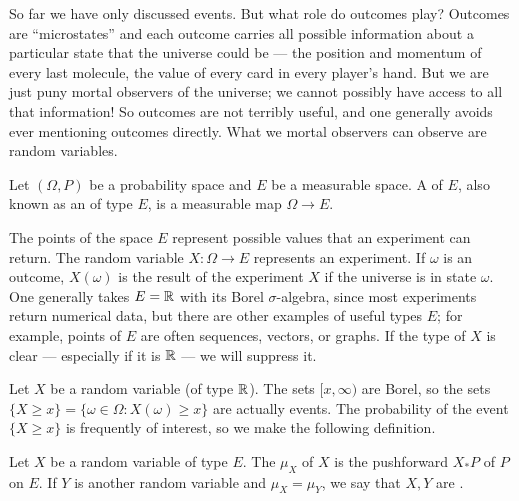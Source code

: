 \begin{subsec}
So far we have only discussed events. But what role do outcomes play?
Outcomes are ``microstates'' and each outcome carries all possible information about a particular state that the universe could be --- the position and momentum of every last molecule, the value of every card in every player's hand.
But we are just puny mortal observers of the universe; we cannot possibly have access to all that information!
So outcomes are not terribly useful, and one generally avoids ever mentioning outcomes directly.
What we mortal observers can observe are random variables.
\end{subsec}

\begin{definition}
Let $(\Omega, P)$ be a probability space and $E$ be a measurable space.
A  of  $E$, also known as an  of type $E$, is a measurable map $\Omega \to E$.
\end{definition}

\begin{subsec}
The points of the space $E$ represent possible values that an experiment can return.
The random variable $X: \Omega \to E$ represents an experiment. If $\omega$ is an outcome, $X(\omega)$ is the result of the experiment $X$ if the universe is in state $\omega$.
One generally takes $E = \mathbb{R}$ with its Borel $\sigma$-algebra, since most experiments return numerical data, but there are other examples of useful types $E$; for example, points of $E$ are often sequences, vectors, or graphs.
If the type of $X$ is clear --- especially if it is $\mathbb{R}$ --- we will suppress it.
\end{subsec}

\begin{subsec}
Let $X$ be a random variable (of type $\mathbb{R}$).
The sets $[x, \infty)$ are Borel, so the sets $\{X \geq x\} = \{\omega \in \Omega: X(\omega) \geq x\}$ are actually events.
The probability of the event $\{X \geq x\}$ is frequently of interest, so we make the following definition.
\end{subsec}

\begin{definition}
Let $X$ be a random variable of type $E$.
The  $\mu_{X}$ of $X$ is the pushforward $X_{*}P$ of $P$ on $E$.
If $Y$ is another random variable and $\mu_{X} = \mu_{Y}$, we say that $X,Y$ are .
\end{definition}

